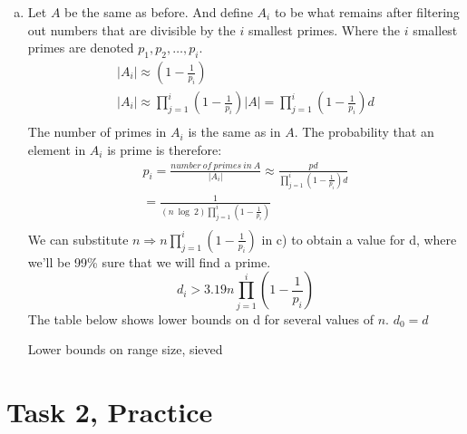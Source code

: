 \documentclass[12pt,a4paper]{article}
\begin{document}
\begin{enumerate}[a)]
    \item
    Let \(A\) be the same as before. And define \(A_i\) to be what remains after filtering out numbers that are
    divisible by the \(i\) smallest primes. Where the \(i\) smallest primes are denoted \(p_1, p_2, \dots , p_i\).
    \begin{gather*}
        |A_i| \approx \left( 1 - \frac{1}{p_i} \right)\\
        |A_i| \approx \prod_{j=1}^{i}\left( 1 - \frac{1}{p_i} \right)|A| =
    \prod_{j=1}^{i}\left( 1 - \frac{1}{p_i} \right)d\\
    \end{gather*}
    The number of primes in \(A_i\) is the same as in \(A\).
    The probability that an element in \(A_i\) is prime is therefore:
    \begin{gather*}
        p_i = \frac{number\ of\ primes\ in\ A}{|A_i|} \approx \frac{pd}{\prod_{j=1}^{i}\left( 1 - \frac{1}{p_i} \right)d}\\
        = \frac{1}{(n\ \log\ 2)\prod_{j=1}^{i}\left( 1 - \frac{1}{p_i} \right)}\\
    \end{gather*}
    We can substitute \(n \Longrightarrow n\prod_{j=1}^{i}\left( 1 - \frac{1}{p_i} \right)\) in c) to obtain a value
    for d, where we'll be 99\% sure that we will find a prime.
    \[d_i > 3.19n\prod_{j=1}^{i}\left( 1 - \frac{1}{p_i} \right)\]
    The table below shows lower bounds on d for several values of \(n\). \(d_0 = d\)
        {\begin{table}[H]
             \centering
             \caption{Lower bounds on range size, sieved}
             \label{tab:sievedlowerbounds}
             
        \end{table}}
    \end{enumerate}

\section*{Task 2, Practice}
\end{document}
